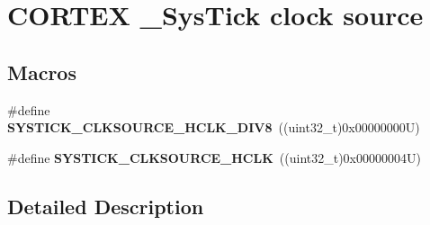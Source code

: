 \hypertarget{group___c_o_r_t_e_x___sys_tick__clock__source}{}\section{C\+O\+R\+T\+EX \+\_\+\+Sys\+Tick clock source}
\label{group___c_o_r_t_e_x___sys_tick__clock__source}
\subsection*{Macros}
\begin{DoxyCompactItemize}
\item 
\mbox{\label{group___c_o_r_t_e_x___sys_tick__clock__source_ga1fd9b5bada2a8b2425a8523bc0fc7124}} 
\#define {\bfseries S\+Y\+S\+T\+I\+C\+K\+\_\+\+C\+L\+K\+S\+O\+U\+R\+C\+E\+\_\+\+H\+C\+L\+K\+\_\+\+D\+I\+V8}~((uint32\+\_\+t)0x00000000\+U)
\item 
\mbox{\label{group___c_o_r_t_e_x___sys_tick__clock__source_ga6f6582df23b6fbc578325e453b9893b7}} 
\#define {\bfseries S\+Y\+S\+T\+I\+C\+K\+\_\+\+C\+L\+K\+S\+O\+U\+R\+C\+E\+\_\+\+H\+C\+LK}~((uint32\+\_\+t)0x00000004\+U)
\end{DoxyCompactItemize}


\subsection{Detailed Description}
